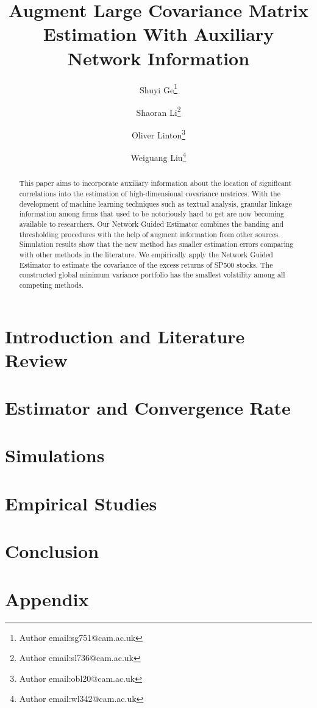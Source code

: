 \documentclass[12pt]{article}
\begin{document}
    \title{Augment Large Covariance Matrix Estimation With Auxiliary Network Information}
    \author[]{Shuyi Ge\thanks{Author email:sg751@cam.ac.uk}}
    \author[]{Shaoran Li\thanks{Author email:sl736@cam.ac.uk}}
    \author[]{Oliver Linton\thanks{Author email:obl20@cam.ac.uk}}
    \author[]{Weiguang Liu\thanks{Author email:wl342@cam.ac.uk}}
    \maketitle
    
    \begin{abstract}
        This paper aims to incorporate auxiliary information about the location of significant correlations into the estimation of high-dimensional covariance matrices. With the development of machine learning techniques such as textual analysis, granular linkage information among firms that used to be notoriously hard to get are now becoming available to researchers. Our Network Guided Estimator combines the banding and thresholding procedures with the help of augment information from other sources. Simulation results show that the new method has smaller estimation errors comparing with other methods in the literature. We empirically apply the Network Guided Estimator to estimate the covariance of the excess returns of SP500 stocks. The constructed global minimum variance portfolio has the smallest volatility among all competing methods.
    \end{abstract}
    
    \section{Introduction and Literature Review}
    \section{Estimator and Convergence Rate}
    \section{Simulations} 
    \section{Empirical Studies}
    \section{Conclusion}
    \section*{Appendix}
    \newpage
\printbibliography
\end{document}

